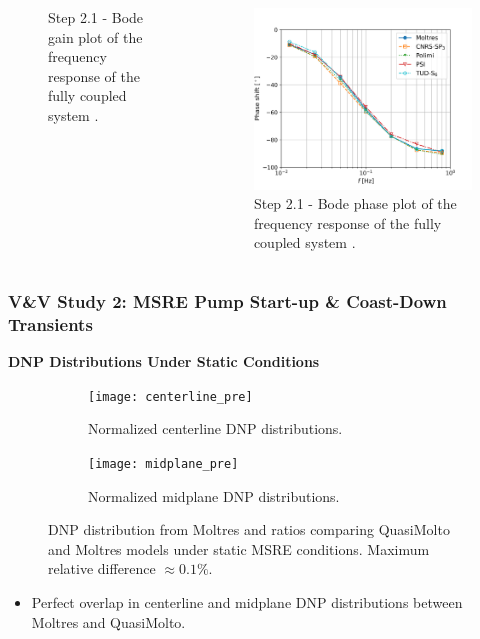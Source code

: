 \begin{frame}[noframenumbering]
\begin{columns}
\begin{figure}
      \caption{Step 2.1 - Bode gain plot of the frequency response of the fully
      coupled system \cite{park_verification_2022}.}
    \end{figure}
    \column[t]{4cm}
    \begin{figure}
      \centering
      \includegraphics[width=\columnwidth]{../images/2-1-phase-plot}
      \caption{Step 2.1 - Bode phase plot of the frequency response of the fully
      coupled system \cite{park_verification_2022}.}
    \end{figure}
    \hfill
  \end{columns}
\end{frame}

\begin{frame}[noframenumbering]
  \frametitle{V\&V Study 2: MSRE Pump Start-up \& Coast-Down Transients}
  \textbf{DNP Distributions Under Static Conditions}
  \begin{figure}[t]
    \centering
    \begin{subfigure}[b]{0.48\columnwidth}
      \centering
      \texttt{[image: centerline\_pre]}
      \caption{Normalized centerline \gls{DNP} distributions.}
      \label{fig:centerline-pre-dist}
    \end{subfigure}
    \hfill
    \begin{subfigure}[b]{0.48\columnwidth}
      \centering
      \texttt{[image: midplane\_pre]}
      \caption{Normalized midplane \gls{DNP} distributions.}
      \label{fig:midplane-pre-dist}
    \end{subfigure}
    \caption{\gls{DNP} distribution from Moltres and ratios comparing QuasiMolto and
    Moltres models under static \gls{MSRE} conditions. Maximum relative difference $\approx 0.1 \%$.}
    \label{fig:centerline-pre}
  \end{figure}
  \begin{itemize}
    \item Perfect overlap in centerline and midplane DNP distributions between Moltres and QuasiMolto.
  \end{itemize}
\end{frame}

